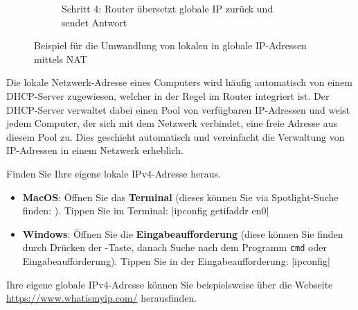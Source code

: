 \begin{figure}[H]
\begin{subfigure}[b]{\textwidth}
		\caption{Schritt 4: Router übersetzt globale \gls{IP} zurück und sendet Antwort}
	\end{subfigure}

	\caption{Beispiel für die Umwandlung von lokalen in globale \gls{IP}-Adressen mittels \gls{NAT}}
	\label{fig:nat-example}
\end{figure}

Die lokale Netzwerk-Adresse eines Computers wird häufig automatisch von einem \gls{DHCP}-Server zugewiesen, welcher in der Regel im Router integriert ist. Der \gls{DHCP}-Server verwaltet dabei einen Pool von verfügbaren \gls{IP}-Adressen und weist jedem Computer, der sich mit dem Netzwerk verbindet, eine freie Adresse aus diesem Pool zu. Dies geschieht automatisch und vereinfacht die Verwaltung von \gls{IP}-Adressen in einem Netzwerk erheblich.

\begin{myexercise}\label{ex:meine-ip}
	Finden Sie Ihre eigene lokale \gls{IP}v4-Adresse heraus.
	\begin{itemize}
		\item[\faApple] \textbf{MacOS}: Öffnen Sie das \textbf{Terminal} (dieses können Sie via Spotlight-Suche finden: \keys{\cmd + \SPACE}). Tippen Sie im Terminal: \commandbox*|ipconfig getifaddr en0|
		\item[\faWindows] \textbf{Windows}: Öffnen Sie die \textbf{Eingabeaufforderung} (diese können Sie finden durch Drücken der \keys{\faWindows}-Taste, danach Suche nach dem Programm \texttt{cmd} oder Eingabeaufforderung). Tippen Sie in der Eingabeaufforderung: \commandbox*|ipconfig|
	\end{itemize}
	Ihre eigene globale \gls{IP}v4-Adresse können Sie beispielsweise über die Webseite \url{https://www.whatismyip.com/} herausfinden.
\end{myexercise}

